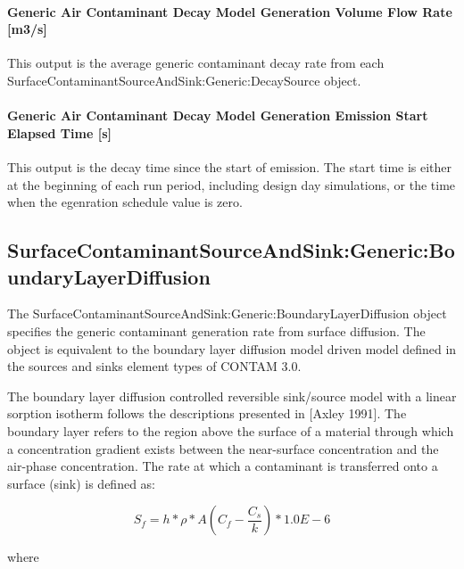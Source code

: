 \paragraph{Generic Air Contaminant Decay Model Generation Volume Flow Rate {[}m3/s{]}}\label{generic-air-contaminant-decay-model-generation-volume-flow-rate-m3s}

This output is the average generic contaminant decay rate from each Surface\-Contaminant\-Source\-And\-Sink:\-Generic:\-Decay\-Source object.

\paragraph{Generic Air Contaminant Decay Model Generation Emission Start Elapsed Time {[}s{]}}\label{generic-air-contaminant-decay-model-generation-emission-start-elapsed-time-s}

This output is the decay time since the start of emission. The start time is either at the beginning of each run period, including design day simulations, or the time when the egenration schedule value is zero.

\subsection{Surface\-Contaminant\-Source\-And\-Sink:\-Generic:\-Boundary\-Layer\-Diffusion}\label{surfacecontaminantsourceandsinkgenericboundarylayerdiffusion}

The Surface\-Contaminant\-Source\-And\-Sink:\-Generic:\-Boundary\-Layer\-Diffusion object specifies the generic contaminant generation rate from surface diffusion. The object is equivalent to the boundary layer diffusion model driven model defined in the sources and sinks element types of CONTAM 3.0.

The boundary layer diffusion controlled reversible sink/source model with a linear sorption isotherm follows the descriptions presented in {[}Axley 1991{]}. The boundary layer refers to the region above the surface of a material through which a concentration gradient exists between the near-surface concentration and the air-phase concentration. The rate at which a contaminant is transferred onto a surface (sink) is defined as:

\begin{equation}
{S_f} = h*\rho *A\left( {{C_f} - \frac{{{C_s}}}{k}} \right)*1.0E - 6
\end{equation}

where

